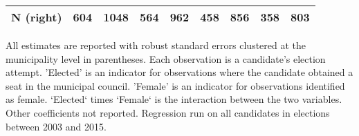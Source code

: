 \begin{table}[!h]
\begin{threeparttable}
\begin{tabular}[t]{lcccccccc}
N (right) & \multicolumn{1}{c}{604} & \multicolumn{1}{c}{1048} & \multicolumn{1}{c}{564} & \multicolumn{1}{c}{962} & \multicolumn{1}{c}{458} & \multicolumn{1}{c}{856} & \multicolumn{1}{c}{358} & \multicolumn{1}{c}{803}\\
\bottomrule
\end{tabular}
\begin{tablenotes}[para]
\item All estimates are reported with robust standard errors clustered at the municipality level in parentheses. Each observation is a candidate's election attempt. 'Elected' is an indicator for observations where the candidate obtained a seat in the municipal council. 'Female' is an indicator for observations identified as female. `Elected` times `Female` is the interaction between the two variables. Other coefficients not reported. Regression run on all candidates in elections between 2003 and 2015.
\end{tablenotes}
\end{threeparttable}
\end{table}